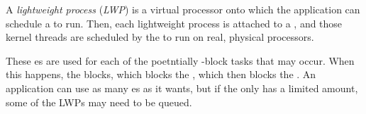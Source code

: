 \begin{definition}\label{def:Lightweight_Process}
  A \emph{lightweight process} (\emph{LWP}) is a virtual processor onto which the application can schedule a  to run.
  Then, each lightweight process is attached to a , and those kernel threads are scheduled by the  to run on real, physical processors.
\end{definition}

These es are used for each of the poetntially -block tasks that may occur.
When this happens, the  blocks, which blocks the , which then blocks the .
An application can use as many es as it wants, but if the  only has a limited amount, some of the LWPs may need to be queued.


